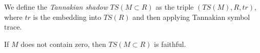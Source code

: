   
  
  

\begin{definition}
  We define the \emph{Tannakian shadow} $TS(M \subset R)$ as the triple $(TS(M), R, tr)$, where $tr$ is the embedding into $TS(R)$ and then applying Tannakian symbol trace. 
\end{definition}

\begin{proposition}
  If $M$ does not contain zero, then $TS(M \subset R)$ is faithful. 
\end{proposition}

